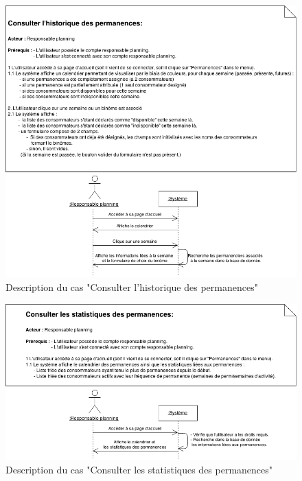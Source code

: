\documentclass[12pt]{report}
\begin{document}
\begin{figure}[!h]
\centering
\includegraphics[width=1.\textwidth]{./ressources/desc_UC_voir_permanences.png}
\caption{Description du cas "Consulter l'historique des permanences"}
\end{figure}
\clearpage

\begin{figure}[!h]
\centering
\includegraphics[width=1.\textwidth]{./ressources/desc_UC_stats_permanences.png}
\caption{Description du cas "Consulter les statistiques des permanences"}
\end{figure}
\clearpage




\clearpage
\end{document}

